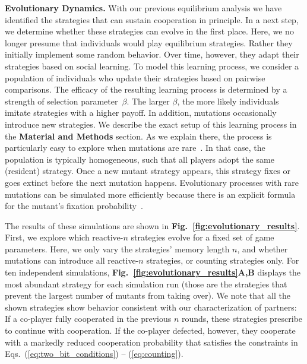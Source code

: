 \documentclass[9pt,twocolumn,twoside]{pnas-new}
\newcommand{\figref}[1]{{\textbf{Fig.~\ref{#1}}}}
\def\methods{\textbf{Material and Methods}}
\begin{document}

\noindent
\textbf{Evolutionary Dynamics.}
With our previous equilibrium analysis we have identified the strategies that can sustain cooperation in principle. 
In a next step, we determine whether these strategies can evolve in the first place. 
Here, we no longer presume that individuals would play equilibrium strategies. 
Rather they initially implement some random behavior. 
Over time, however, they adapt their strategies based on social learning.
To model this learning process, we consider a population of individuals who update their strategies based on pairwise comparisons. 
The efficacy of the resulting learning process is determined by a strength of selection parameter~$\beta$. 
The larger $\beta$, the more likely individuals imitate strategies with a higher payoff. 
In addition, mutations occasionally introduce new strategies.
We describe the exact setup of this learning process in the \methods{} section.
As we explain there, the process is particularly easy to explore when mutations are rare~\cite{fudenberg:JET:2006,wu:JMB:2012,imhof:royal:2010,mcavoy:jet:2015}. 
In that case, the population is typically homogeneous, such that all players adopt the same (resident) strategy.   
Once a new mutant strategy appears, this strategy fixes or goes extinct before the next mutation happens. 
Evolutionary processes with rare mutations can be simulated more efficiently because there is an explicit formula for the mutant's fixation probability~\citep{nowak:Nature:2004}. 

The results of these simulations are shown in \figref{fig:evolutionary_results}. 
First, we explore which reactive-$n$ strategies evolve for a fixed set of game parameters. 
Here, we only vary the strategies' memory length $n$, and whether mutations can introduce all reactive-$n$ strategies, or counting strategies only. 
For ten independent simulations, \figref{fig:evolutionary_results}\textbf{A,B} displays the most abundant strategy for each simulation run (those are the strategies that prevent the largest number of mutants from taking over). 
We note that all the shown strategies show behavior consistent with our characterization of partners: 
If a co-player fully cooperated in the previous $n$ rounds, these strategies prescribe to continue with cooperation. 
If the co-player defected, however, they cooperate with a markedly reduced cooperation probability that satisfies the constraints in Eqs.~(\ref{eq:two_bit_conditions}) -- (\ref{eq:counting}).
\end{document}

